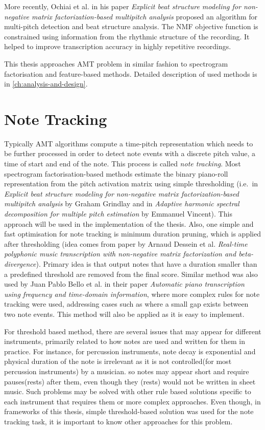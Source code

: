 More recently, Ochiai et al. in his paper \textit{Explicit beat structure modeling for non-negative matrix
factorization-based multipitch analysis}\cite{ochiai2012explicit} proposed an algorithm for multi-pitch detection and
beat structure analysis. The \ac{NMF} objective function is constrained using information from the rhythmic structure of
the recording. It helped to improve transcription accuracy in highly repetitive recordings.

This thesis approaches \ac{AMT} problem in similar fashion to spectrogram factorisation and feature-based methods.
Detailed description of used methods is in \cref{ch:analysis-and-design}.

\section{Note Tracking}\label{sec:note-tracking}

Typically \ac{AMT} algorithms compute a time-pitch representation which needs to be further processed in order to detect
note events with a discrete pitch value, a time of start and end of the note. This process is called \textit{note
tracking}. Most spectrogram factorisation-based methods estimate the binary piano-roll representation from the pitch
activation matrix using simple thresholding (i.e.\ in \textit{Explicit beat structure modeling for non-negative matrix
factorization-based multipitch analysis}\cite{grindlay2011transcribing} by Graham Grindlay and in \textit{Adaptive
harmonic spectral decomposition for multiple pitch estimation}\cite{vincent2009adaptive} by Emmanuel Vincent). This
approach will be used in the implementation of the thesis. Also, one simple and fast optimisation for note tracking is
minimum duration pruning, which is applied after thresholding (idea comes from paper by Arnaud Dessein et al.
\textit{Real-time polyphonic music transcription with non-negative matrix factorization and beta-divergence}\cite{dessein2010real}).
Primary idea is that output notes that have a duration smaller than a predefined threshold are removed from the final
score. Similar method was also used by Juan Pablo Bello et al. in their paper \textit{Automatic piano transcription
using frequency and time-domain information}\cite{bello2006automatic}, where more complex rules for note tracking were
used, addressing cases such as where a small gap exists between two note events. This method will also be applied as it
is easy to implement.

For threshold based method, there are several issues that may appear for different instruments, primarily related to how
notes are used and written for them in practice. For instance, for percussion instruments, note decay is exponential and
physical duration of the note is irrelevant as it is not controlled(for most percussion instruments) by a musician. so
notes may appear short and require pauses(rests) after them, even though they (rests) would not be written in sheet
music. Such problems may be solved with other rule based solutions specific to each instrument that requires them or
more complex approaches. Even though, in frameworks of this thesis, simple threshold-based solution was used for
the note tracking task, it is important to know other approaches for this problem.

